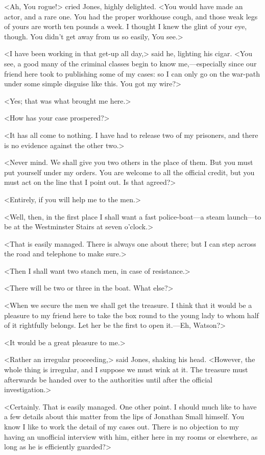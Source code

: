 <Ah, You rogue!> cried Jones, highly delighted. <You would have made an actor, and a rare one. You had the proper workhouse cough, and those weak legs of yours are worth ten pounds a week. I thought I knew the glint of your eye, though. You didn't get away from us so easily, You see.>

<I have been working in that get-up all day,> said he, lighting his cigar. <You see, a good many of the criminal classes begin to know me,—especially since our friend here took to publishing some of my cases: so I can only go on the war-path under some simple disguise like this. You got my wire?>

<Yes; that was what brought me here.>

<How has your case prospered?>

<It has all come to nothing. I have had to release two of my prisoners, and there is no evidence against the other two.>

<Never mind. We shall give you two others in the place of them. But you must put yourself under my orders. You are welcome to all the official credit, but you must act on the line that I point out. Is that agreed?>

<Entirely, if you will help me to the men.>

<Well, then, in the first place I shall want a fast police-boat—a steam launch—to be at the Westminster Stairs at seven o'clock.>

<That is easily managed. There is always one about there; but I can step across the road and telephone to make sure.>

<Then I shall want two stanch men, in case of resistance.>

<There will be two or three in the boat. What else?>

<When we secure the men we shall get the treasure. I think that it would be a pleasure to my friend here to take the box round to the young lady to whom half of it rightfully belongs. Let her be the first to open it.—Eh, Watson?>

<It would be a great pleasure to me.>

<Rather an irregular proceeding,> said Jones, shaking his head. <However, the whole thing is irregular, and I suppose we must wink at it. The treasure must afterwards be handed over to the authorities until after the official investigation.>

<Certainly. That is easily managed. One other point. I should much like to have a few details about this matter from the lips of Jonathan Small himself. You know I like to work the detail of my cases out. There is no objection to my having an unofficial interview with him, either here in my rooms or elsewhere, as long as he is efficiently guarded?>

